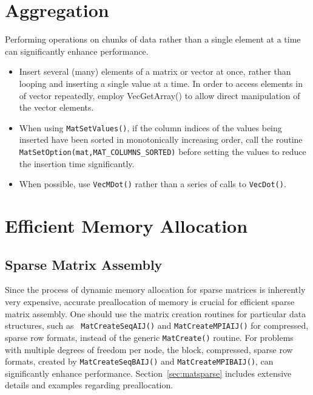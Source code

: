\section{Aggregation}

Performing operations on chunks of data rather than a single element
at a time can significantly enhance performance.  
\begin{itemize}
\item Insert several (many) elements of a matrix or vector at once, rather 
   than looping and inserting a single value at a time.  In order to
   access elements in of vector repeatedly, employ {VecGetArray()} to allow 
   direct manipulation of the vector elements. 

\item When using {\tt MatSetValues()}, if the column indices of the values being
   inserted have been sorted in monotonically increasing order, call
   the routine {\tt MatSetOption(mat,MAT\_COLUMNS\_SORTED)} before setting the values
   to reduce the insertion time significantly.

\item When possible, use {\tt VecMDot()} rather than a series of calls to {\tt VecDot()}.
\end{itemize}

\section{Efficient Memory Allocation}
\label{sec:perf:memory}

\subsection{Sparse Matrix Assembly}

Since the process of dynamic memory allocation for sparse matrices is
inherently very expensive, accurate preallocation of memory is crucial
for efficient sparse matrix assembly.  One should use the matrix creation
routines for particular data structures, such as {\tt
MatCreateSeqAIJ()} and {\tt MatCreateMPIAIJ()} for compressed, sparse
row formats, instead of the generic {\tt MatCreate()} routine.  For
problems with multiple degrees of freedom per node, the block,
compressed, sparse row formats, created by {\tt MatCreateSeqBAIJ()}
and {\tt MatCreateMPIBAIJ()}, can significantly enhance performance.
Section~\ref{sec:matsparse} includes extensive details and
examples regarding preallocation.

